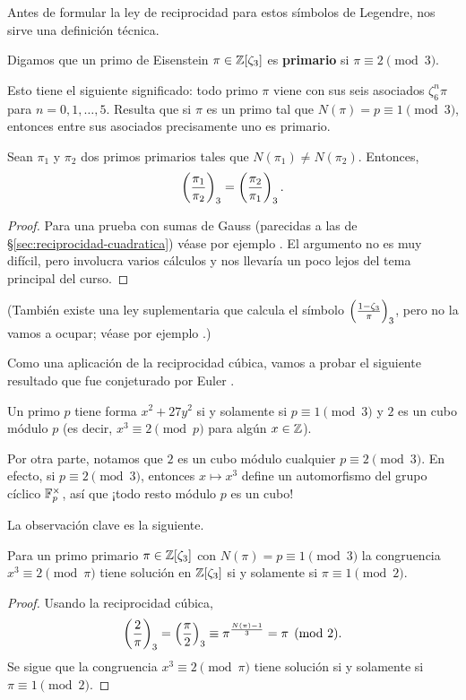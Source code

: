 Antes de formular la ley de reciprocidad para estos símbolos de Legendre,
nos sirve una definición técnica.

\begin{definicion}
  Digamos que un primo de Eisenstein $\pi \in \mathbb{Z} [\zeta_3]$ es
  \textbf{primario} si $\pi \equiv 2 \pmod{3}$.
\end{definicion}

Esto tiene el siguiente significado: todo primo $\pi$ viene con sus seis
asociados $\zeta_6^n \pi$ para $n = 0,1,\ldots,5$. Resulta que si $\pi$ es un
primo tal que $N (\pi) = p \equiv 1 \pmod{3}$, entonces entre sus asociados
precisamente uno es primario.

\begin{teorema}
  Sean $\pi_1$ y $\pi_2$ dos primos primarios tales que
  $N (\pi_1) \ne N (\pi_2)$. Entonces,
  $$\left(\frac{\pi_1}{\pi_2}\right)_3 = \left(\frac{\pi_2}{\pi_1}\right)_3.$$

  \begin{proof}
    Para una prueba con sumas de Gauss (parecidas a las de
    \S\ref{sec:reciprocidad-cuadratica}) véase por ejemplo
    \cite[Chapter~9]{Ireland-Rosen}. El argumento no es muy difícil,
    pero involucra varios cálculos y nos llevaría un poco lejos del tema
    principal del curso.
  \end{proof}
\end{teorema}
(También existe una ley suplementaria que calcula el símbolo
$\left(\frac{1-\zeta_3}{\pi}\right)_3$, pero no la vamos a ocupar;
véase por ejemplo \cite{Williams-1977}.)

Como una aplicación de la reciprocidad cúbica, vamos a probar el siguiente
resultado que fue conjeturado por Euler \cite[\S 407--408]{E792}.

\begin{teorema}
  \label{thm:2-cubo-mod-p}
  Un primo $p$ tiene forma $x^2 + 27 y^2$ si y solamente si
  $p \equiv 1 \pmod{3}$ y $2$ es un cubo módulo $p$
  (es decir, $x^3 \equiv 2 \pmod{p}$ para algún $x \in \mathbb{Z}$).
\end{teorema}

Por otra parte, notamos que $2$ es un cubo módulo cualquier
$p \equiv 2\pmod{3}$. En efecto, si $p \equiv 2\pmod{3}$, entonces
$x \mapsto x^3$ define un automorfismo del grupo cíclico $\mathbb{F}_p^\times$,
así que ¡todo resto módulo $p$ es un cubo!


La observación clave es la siguiente.

\begin{lema}
  Para un primo primario $\pi \in \mathbb{Z} [\zeta_3]$ con
  $N (\pi) = p \equiv 1 \pmod{3}$ la congruencia $x^3 \equiv 2 \pmod{\pi}$ tiene
  solución en $\mathbb{Z} [\zeta_3]$ si y solamente si $\pi \equiv 1 \pmod{2}$.

  \begin{proof}
    Usando la reciprocidad cúbica,
    \[ \left(\frac{2}{\pi}\right)_3 = \left(\frac{\pi}{2}\right)_3 \equiv \pi^{\frac{N(\pi) - 1}{3}}
           = \pi \pmod{2}. \]
    Se sigue que la congruencia $x^3 \equiv 2 \pmod{\pi}$
    tiene solución si y solamente si $\pi \equiv 1 \pmod{2}$.
  \end{proof}
\end{lema}

